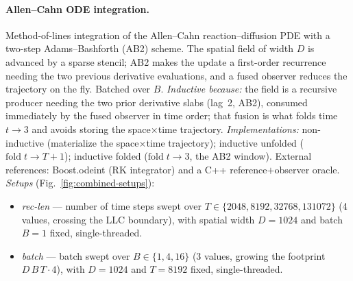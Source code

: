 \paragraph{Allen--Cahn ODE integration.}
Method-of-lines integration of the Allen--Cahn reaction--diffusion PDE with a
two-step Adams--Bashforth (AB2) scheme. The spatial field of width $D$ is advanced
by a sparse stencil; AB2 makes the update a first-order recurrence needing the two
previous derivative evaluations, and a fused observer reduces the trajectory on
the fly. Batched over $B$.
\emph{Inductive because:} the field is a recursive producer needing the two prior
derivative slabs (lag~2, AB2), consumed immediately by the fused observer in time
order; that fusion is what folds time $t\!\to\!3$ and avoids storing the
space$\times$time trajectory.
\emph{Implementations:} non-inductive (materialize the space$\times$time
trajectory); inductive unfolded ($\mathrm{fold}\;t\!\to\!T{+}1$); inductive folded
($\mathrm{fold}\;t\!\to\!3$, the AB2 window). External references: Boost.odeint (RK
integrator) and a C++ reference$+$observer oracle.
\emph{Setups} (Fig.~\ref{fig:combined-setups}):
\begin{itemize}\itemsep2pt
  \item \textit{rec-len} --- number of time steps swept over
    $T\in\{2048,8192,32768,131072\}$ (4 values, crossing the LLC boundary), with
    spatial width $D{=}1024$ and batch $B{=}1$ fixed, single-threaded.
  \item \textit{batch} --- batch swept over $B\in\{1,4,16\}$ (3 values, growing
    the footprint $D\,B\,T\cdot 4$), with $D{=}1024$ and $T{=}8192$ fixed,
    single-threaded.
\end{itemize}

